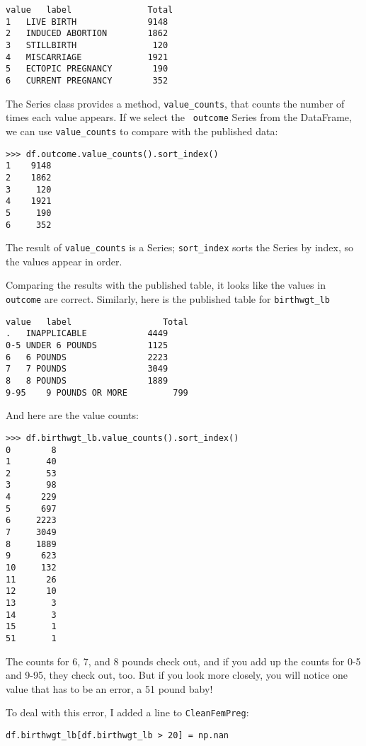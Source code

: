 \begin{verbatim}
value	label	 	        Total
1	LIVE BIRTH              9148
2	INDUCED ABORTION        1862
3	STILLBIRTH               120
4	MISCARRIAGE             1921
5	ECTOPIC PREGNANCY        190
6	CURRENT PREGNANCY        352
\end{verbatim}

The Series class provides a method, \verb"value_counts", that
counts the number of times each value appears.  If we select the {\tt
  outcome} Series from the DataFrame, we can use \verb"value_counts"
to compare with the published data:

\begin{verbatim}
>>> df.outcome.value_counts().sort_index()
1    9148
2    1862
3     120
4    1921
5     190
6     352
\end{verbatim}

The result of \verb"value_counts" is a Series;
\verb"sort_index" sorts the Series by index, so the
values appear in order.

Comparing the results with the published table, it looks like the
values in {\tt outcome} are correct.  Similarly, here is the published
table for \verb"birthwgt_lb"

\begin{verbatim}
value	label                  Total
.	INAPPLICABLE            4449
0-5	UNDER 6 POUNDS          1125
6	6 POUNDS                2223
7	7 POUNDS                3049
8	8 POUNDS                1889
9-95	9 POUNDS OR MORE         799
\end{verbatim}

And here are the value counts:

\begin{verbatim}
>>> df.birthwgt_lb.value_counts().sort_index()
0        8
1       40
2       53
3       98
4      229
5      697
6     2223
7     3049
8     1889
9      623
10     132
11      26
12      10
13       3
14       3
15       1
51       1
\end{verbatim}

The counts for 6, 7, and 8 pounds check out, and if you add
up the counts for 0-5 and 9-95, they check out, too.  But
if you look more closely, you will notice one value that has to be
an error, a 51 pound baby!

To deal with this error, I added a line to {\tt CleanFemPreg}:

\begin{verbatim}
df.birthwgt_lb[df.birthwgt_lb > 20] = np.nan
\end{verbatim}

